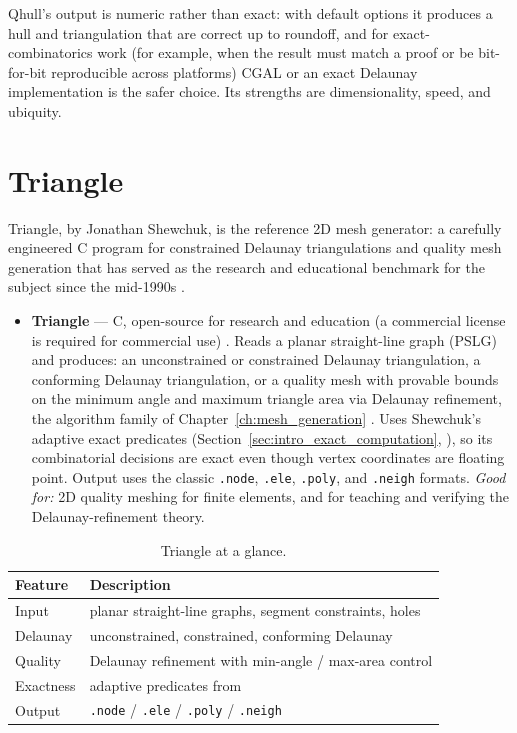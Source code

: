 Qhull's output is numeric rather than exact: with default options it
produces a hull and triangulation that are correct up to roundoff, and
for exact-combinatorics work (for example, when the result must match a
proof or be bit-for-bit reproducible across platforms) CGAL or an exact
Delaunay implementation is the safer choice. Its strengths are
dimensionality, speed, and ubiquity.

\section{Triangle}
\label{sec:app_soft_triangle}

Triangle, by Jonathan Shewchuk, is the reference 2D mesh generator: a
carefully engineered C program for constrained Delaunay triangulations
and quality mesh generation that has served as the research and
educational benchmark for the subject since the mid-1990s
\cite{triangle,ruppert1995,shewchuk2002}.

\begin{itemize}
  \item \textbf{Triangle} --- C, open-source for research and education
    (a commercial license is required for commercial use)
    \cite{triangle}. Reads a planar straight-line graph (PSLG) and
    produces: an unconstrained or constrained Delaunay triangulation, a
    conforming Delaunay triangulation, or a quality mesh with provable
    bounds on the minimum angle and maximum triangle area via Delaunay
    refinement, the algorithm family of
    Chapter~\ref{ch:mesh_generation} \cite{ruppert1995,shewchuk2002}.
    Uses Shewchuk's adaptive exact predicates
    (Section~\ref{sec:intro_exact_computation}, \cite{shewchuk1997}),
    so its combinatorial decisions are exact even though vertex
    coordinates are floating point. Output uses the classic
    \texttt{.node}, \texttt{.ele}, \texttt{.poly}, and \texttt{.neigh}
    formats. \emph{Good for:} 2D quality meshing for finite elements,
   and for teaching and verifying the Delaunay-refinement theory.
\end{itemize}

\begin{table}[ht]
\centering
\begin{tabular}{ll}
\hline
\textbf{Feature} & \textbf{Description} \\
\hline
Input & planar straight-line graphs, segment constraints, holes \\
Delaunay & unconstrained, constrained, conforming Delaunay \\
Quality & Delaunay refinement with min-angle / max-area control \\
Exactness & adaptive predicates from \cite{shewchuk1997} \\
Output & \texttt{.node} / \texttt{.ele} / \texttt{.poly} / \texttt{.neigh} \\
\hline
\end{tabular}
\caption{Triangle at a glance.}
\label{tbl:appsoft_triangle}
\end{table}

